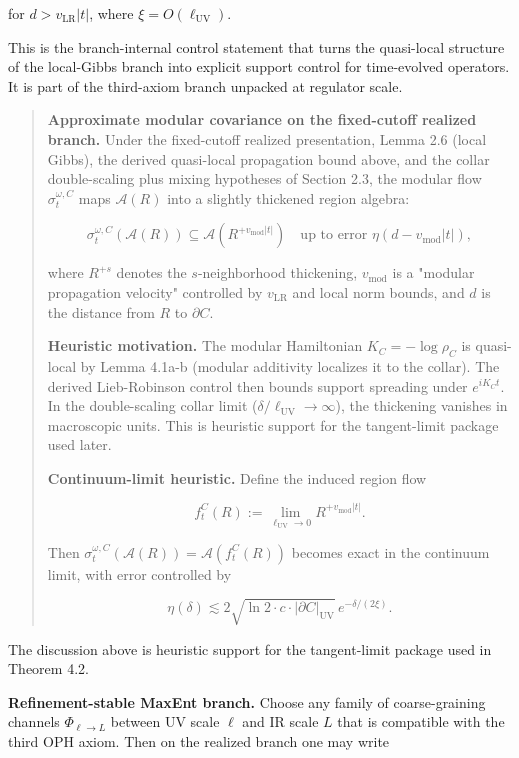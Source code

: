 for \(d > v_{\mathrm{LR}}|t|\), where \(\xi = O(\ell_{\mathrm{UV}})\).

This is the branch-internal control statement that turns the quasi-local structure of the
local-Gibbs branch into explicit support control for time-evolved operators. It is part of the
third-axiom branch unpacked at regulator scale.

\begin{quote}
\textbf{Approximate modular covariance on the fixed-cutoff realized branch.} Under the fixed-cutoff realized presentation, Lemma 2.6 (local Gibbs), the derived quasi-local propagation bound above, and the collar double-scaling plus mixing hypotheses of Section 2.3, the modular flow \(\sigma_t^{\omega,C}\) maps \(\mathcal{A}(R)\) into a slightly thickened region algebra:

\[
\sigma_t^{\omega,C}(\mathcal{A}(R)) \subseteq \mathcal{A}(R^{+v_{\mathrm{mod}}|t|})
\quad \text{up to error } \eta(d - v_{\mathrm{mod}}|t|),
\]

where \(R^{+s}\) denotes the \(s\)-neighborhood thickening, \(v_{\mathrm{mod}}\) is a "modular propagation velocity" controlled by \(v_{\mathrm{LR}}\) and local norm bounds, and \(d\) is the distance from \(R\) to \(\partial C\).

\textbf{Heuristic motivation.} The modular Hamiltonian \(K_C = -\log \rho_C\) is quasi-local by Lemma 4.1a-b (modular additivity localizes it to the collar). The derived Lieb-Robinson control then bounds support spreading under \(e^{iK_C t}\). In the double-scaling collar limit (\(\delta/\ell_{\mathrm{UV}} \to \infty\)), the thickening vanishes in macroscopic units. This is heuristic support for the tangent-limit package used later.

\textbf{Continuum-limit heuristic.} Define the induced region flow

\[
f_t^C(R) := \lim_{\ell_{\mathrm{UV}} \to 0} R^{+v_{\mathrm{mod}}|t|}.
\]

Then \(\sigma_t^{\omega,C}(\mathcal{A}(R)) = \mathcal{A}(f_t^C(R))\) becomes exact in the continuum limit, with error controlled by

\[
\eta(\delta) \lesssim 2\sqrt{\ln 2 \cdot c \cdot |\partial C|_{\mathrm{UV}}} \, e^{-\delta/(2\xi)}.
\]
\end{quote}

The discussion above is heuristic support for the tangent-limit package used in Theorem 4.2.

\textbf{Refinement-stable MaxEnt branch.} Choose any family of coarse-graining channels \(\Phi_{\ell\to L}\) between UV scale \(\ell\) and IR scale \(L\) that is compatible with the third OPH axiom. Then on the realized branch one may write

